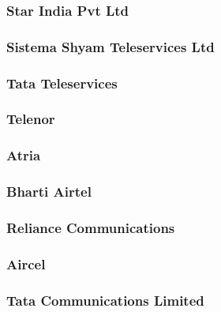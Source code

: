 \documentclass{article}
\begin{document}
\subsubsection{Star India Pvt Ltd}


\subsubsection{Sistema Shyam Teleservices Ltd}


\subsubsection{Tata Teleservices}


\subsubsection{Telenor}


\subsubsection{Atria}


\subsubsection{Bharti Airtel}


\subsubsection{Reliance Communications}


\subsubsection{Aircel}


\subsubsection{Tata Communications Limited}

\end{document}
